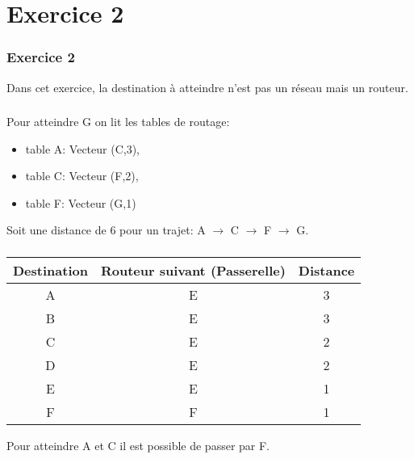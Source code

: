 \documentclass[svgnames,11pt]{beamer}
\begin{document}
\section{Exercice 2}
\begin{frame}
    \frametitle{Exercice 2}

    \begin{aretenir}[Remarque]
        Dans cet exercice, la destination à atteindre n'est pas un réseau mais un routeur.
        \end{aretenir}

\end{frame}
\begin{frame}
    \frametitle{}

    Pour atteindre G on lit les tables de routage:
    \begin{itemize}
        \item table A: Vecteur (C,3),
        \item table C: Vecteur (F,2),
        \item table F: Vecteur (G,1)
    \end{itemize}
    Soit une distance de 6 pour un trajet: A $\rightarrow$ C $\rightarrow$ F $\rightarrow$ G.

\end{frame}
\begin{frame}
    \frametitle{}

    
    \begin{center}
        \begin{tabular}{|*{3}{c|}}
            \hline
            Destination & Routeur suivant (Passerelle) & Distance \\
            \hline
            A & E & 3\\
            \hline
            B & E & 3\\
            \hline
            C & E & 2\\
            \hline
            D & E & 2\\
            \hline
            E & E & 1\\
            \hline
            F & F & 1\\
            \hline
        \end{tabular}
    \end{center}
    \begin{aretenir}[Remarque]
    Pour atteindre A et C il est possible de passer par F.
    \end{aretenir}
\end{frame}
\end{document}
